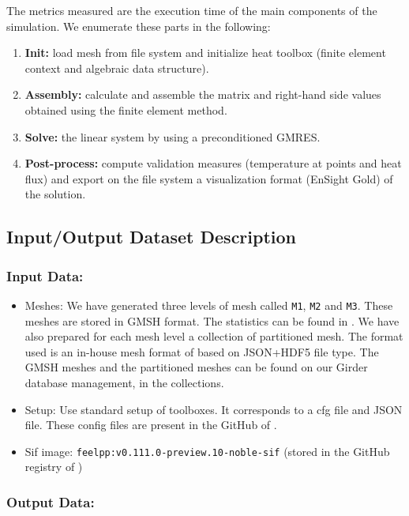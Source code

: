 The metrics measured are the execution time of the main components of the simulation.
We enumerate these parts in the following:
\begin{enumerate}
\item \textbf{Init:} load mesh from file system and initialize heat toolbox (finite element context and algebraic data structure).
\item \textbf{Assembly:} calculate and assemble the matrix and right-hand side values obtained using the finite element method.
\item \textbf{Solve:} the linear system by using a preconditioned GMRES.
\item \textbf{Post-process:} compute validation measures (temperature at points and heat flux) and export on the file system a visualization format (EnSight Gold) of the solution.
\end{enumerate}




\subsection{Input/Output Dataset Description}


\subsubsection{Input Data:}
  \begin{itemize}
  \item Meshes: We have generated three levels of mesh called \texttt{M1}, \texttt{M2}
    and \texttt{M3}. These meshes are stored in GMSH format. The statistics can be found in . We have also prepared for
    each mesh level a collection of partitioned mesh.
    The format used is an in-house mesh format of \Feelpp based on
    JSON+HDF5 file type.
    The GMSH meshes and the partitioned meshes can be found on our Girder
    database management, in the \Feelpp collections.
  \item Setup: Use standard setup of \Feelpp toolboxes. It corresponds to a cfg
    file and JSON file. These config files are present in the GitHub of \Feelpp.
  \item Sif image: \texttt{feelpp:v0.111.0-preview.10-noble-sif}  (stored in the GitHub registry of \Feelpp)
  \end{itemize}

\subsubsection{Output Data:}

